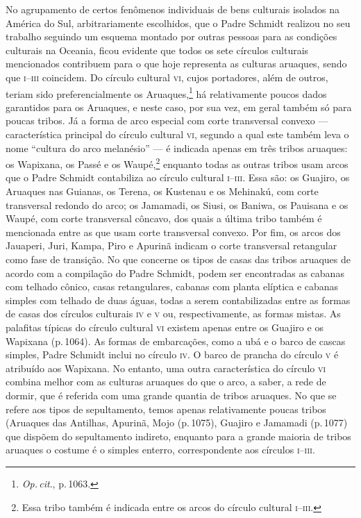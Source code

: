 No agrupamento de certos fenômenos individuais de bens culturais
isolados na América do Sul, arbitrariamente escolhidos, que o Padre
Schmidt realizou no seu trabalho seguindo um esquema montado por outras
pessoas para as condições culturais na Oceania, ficou evidente que
todos os sete círculos culturais mencionados contribuem para o que hoje
representa as culturas aruaques, sendo que \textsc{i--iii} coincidem. Do círculo
cultural \textsc{vi}, cujos portadores, além de outros, teriam sido
preferencialmente os Aruaques,\footnote{\textit{Op.\,cit}., p.\,1063.} há
relativamente poucos dados garantidos para os Aruaques, e neste caso,
por sua vez, em geral também só para poucas tribos. Já a forma de arco
especial com corte transversal convexo --- característica principal do
círculo cultural \textsc{vi}, segundo a qual este também leva o nome ``cultura do
arco melanésio'' --- é indicada apenas em três tribos aruaques: os
Wapixana, os Passé e os Waupé,\footnote{Essa tribo também é indicada
  entre os arcos do círculo cultural \textsc{i--iii}.} enquanto todas as outras
tribos usam arcos que o Padre Schmidt contabiliza ao círculo cultural
\textsc{i--iii}. Essa são: os Guajiro, os Aruaques nas Guianas, os Terena, os
Kustenau e os Mehinakú, com corte transversal redondo do arco; os
Jamamadi, os Siusi, os Baniwa, os Pauisana e os Waupé, com corte
transversal côncavo, dos quais a última tribo também é mencionada entre
as que usam corte transversal convexo. Por fim, os arcos dos Jauaperi,
Juri, Kampa, Piro e Apurinã indicam o corte transversal retangular como
fase de transição. No que concerne os tipos de casas das tribos aruaques
de acordo com a compilação do Padre Schmidt, podem ser encontradas as
cabanas com telhado cônico, casas retangulares, cabanas com planta
elíptica e cabanas simples com telhado de duas águas, todas a serem
contabilizadas entre as formas de casas dos círculos culturais \textsc{iv} e \textsc{v}
ou, respectivamente, as formas mistas. As palafitas típicas do círculo
cultural \textsc{vi} existem apenas entre os Guajiro e os Wapixana (p.\,1064). As
formas de embarcações, como a ubá e o barco de cascas simples, Padre
Schmidt inclui no círculo \textsc{iv}. O barco de prancha do círculo \textsc{v} é
atribuído aos Wapixana. No entanto, uma outra característica do círculo
\textsc{vi} combina melhor com as culturas aruaques do que o arco, a saber, a rede
de dormir, que é referida com uma grande quantia de tribos aruaques. No
que se refere aos tipos de sepultamento, temos apenas relativamente
poucas tribos (Aruaques das Antilhas, Apurinã, Mojo (p.\,1075),
Guajiro e Jamamadi (p.\,1077) que dispõem do sepultamento indireto,
enquanto para a grande maioria de tribos aruaques o costume é o simples
enterro, correspondente aos círculos \textsc{i--iii}.

